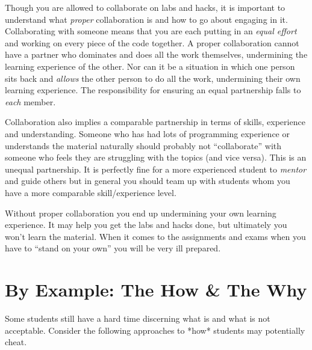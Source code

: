 \documentclass[12pt]{scrartcl}
\begin{document}
Though you are allowed to collaborate on labs and hacks, it is important to 
understand what \emph{proper} collaboration is and how to go about engaging
in it.  Collaborating with someone means that you are each putting in an 
\emph{equal effort} and working on every piece of the code together.  
A proper collaboration cannot have a partner who dominates and does all 
the work themselves, undermining the learning experience of the other.
Nor can it be a situation in which one person sits back and \emph{allows}
the other person to do all the work, undermining their own learning 
experience.  The responsibility for ensuring an equal partnership falls
to \emph{each} member.

Collaboration also implies a comparable partnership in terms of skills, 
experience and understanding.  Someone who has had lots of programming 
experience or understands the material naturally should probably not 
``collaborate'' with someone who feels they are struggling with the
topics (and vice versa).  This is an unequal partnership.  It is 
perfectly fine for a more experienced student to \emph{mentor} and 
guide others but in general you should team up with students whom 
you have a more comparable skill/experience level.

Without proper collaboration you end up undermining your own 
learning experience.  It may help you get the labs and hacks done, 
but ultimately you won't learn the material.  When it comes to
the assignments and exams when you have to ``stand on your own''
you will be very ill prepared.  

\section*{By Example: The How \& The Why}

Some students still have a hard time discerning what is and what
is not acceptable.  Consider the following approaches to *how*
students may potentially cheat.
\end{document}
